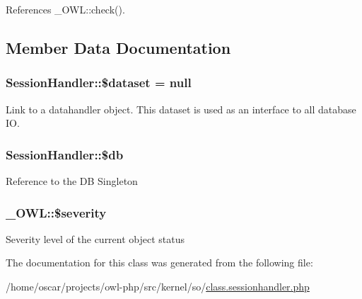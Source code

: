 References \_\-OWL::check().



\subsection{Member Data Documentation}
\subsubsection[{\$dataset}]{\setlength{\rightskip}{0pt plus 5cm}SessionHandler::\$dataset = null}\label{classSessionHandler_a74c46fcfbadd4c4e6bacc73ddf350056}
Link to a datahandler object. This dataset is used as an interface to all database IO. 
\subsubsection[{\$db}]{\setlength{\rightskip}{0pt plus 5cm}SessionHandler::\$db}\label{classSessionHandler_a0bb7c3206f3664f2a4b8e96edf49a3bc}
Reference to the DB Singleton 
\subsubsection[{\$severity}]{\setlength{\rightskip}{0pt plus 5cm}\_\-OWL::\$severity}\label{class__OWL_ad26b40a9dbbacb33e299b17826f8327c}
Severity level of the current object status 

The documentation for this class was generated from the following file:\begin{DoxyCompactItemize}
\item 
/home/oscar/projects/owl-\/php/src/kernel/so/\hyperlink{class_8sessionhandler_8php}{class.sessionhandler.php}\end{DoxyCompactItemize}
